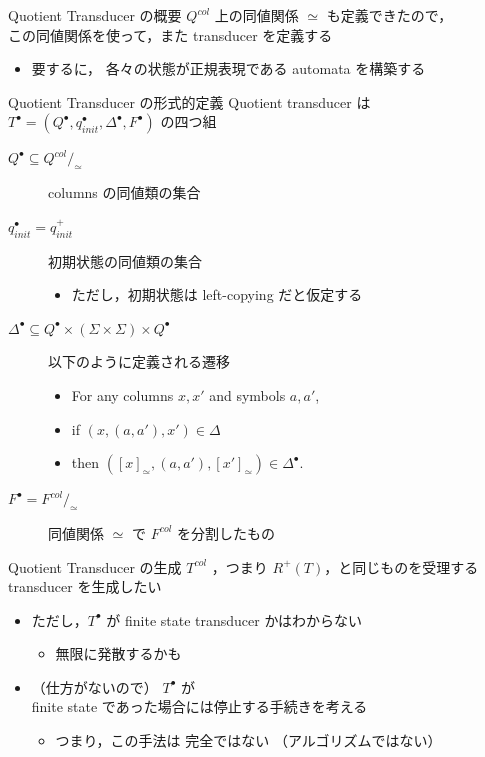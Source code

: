 \documentclass[presentation, xetex]{beamer}
\begin{document}
\begin{frame}[label={sec:org6c4a40d}]{Quotient Transducer の概要}
\(Q^{col}\) 上の同値関係 \(\simeq\) も定義できたので，\\
この同値関係を使って，また transducer を定義する
\begin{itemize}
\item 要するに， \alert{\alert{各々の状態が正規表現である automata}} を構築する
\end{itemize}
\end{frame}


\begin{frame}[label={sec:orge76479d}]{Quotient Transducer の形式的定義}
\alert{\alert{Quotient transducer}} は \(T^\bullet = (Q^\bullet, q_{init}^\bullet, \Delta^\bullet, F^\bullet)\) の四つ組
\begin{description}
\item[{\(Q^\bullet \subseteq Q^{col}/_{\simeq}\)}] columns の同値類の集合
\item[{\(q_{init}^\bullet = q_{init}^+\)}] 初期状態の同値類の集合
\begin{itemize}
\item ただし，初期状態は left-copying だと仮定する
\end{itemize}
\item[{\(\Delta^\bullet \subseteq Q^\bullet \times (\Sigma \times \Sigma) \times Q^\bullet\)}] 以下のように定義される遷移
\begin{itemize}
\item For any columns \(x,x'\) and symbols \(a,a'\),
\item if \((x,(a,a'),x') \in \Delta\)
\item then \(([x]_\simeq, (a, a'), [x']_\simeq) \in \Delta^\bullet\).
\end{itemize}
\item[{\(F^\bullet = F^{col}/_\simeq\)}] 同値関係 \(\simeq\) で \(F^{col}\) を分割したもの
\end{description}
\end{frame}



\begin{frame}[label={sec:org53f2c8b}]{Quotient Transducer の生成}
\(T^{col}\) ，つまり \(R^+(T)\)，と同じものを受理する transducer を生成したい
\begin{itemize}
\item ただし，\(T^\bullet\) が \alert{\alert{finite state transducer かはわからない}}
\begin{itemize}
\item 無限に発散するかも
\end{itemize}
\item （仕方がないので） \(T^\bullet\) が \\
finite state であった場合には停止する手続きを考える
\begin{itemize}
\item つまり，この手法は \alert{\alert{完全ではない}} （アルゴリズムではない）
\end{itemize}
\end{itemize}
\end{frame}
\end{document}

